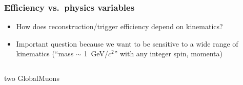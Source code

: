 \documentclass[compress]{beamer}
\begin{document}


\begin{frame}
\frametitle{Efficiency vs.\ physics variables}
\begin{itemize}
\item How does reconstruction/trigger efficiency depend on kinematics?

\item Important question because we want to be sensitive to a wide range of
  kinematics (``mass $\sim$ 1~GeV/$c^2$'' with any integer spin, momenta)
\end{itemize}

\begin{columns}
\centering two GlobalMuons



\end{columns}
\end{frame}
\end{document}
